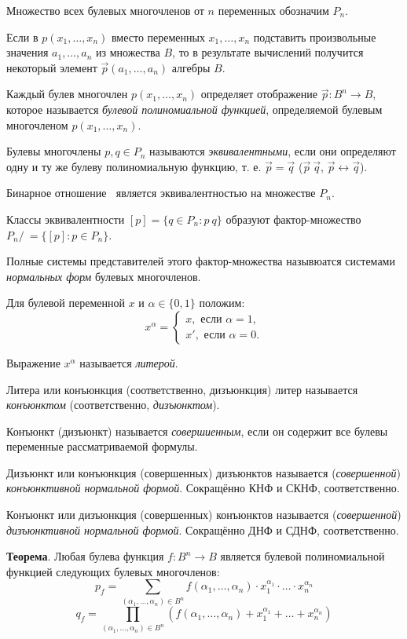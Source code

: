 Множество всех булевых многочленов от $n$ переменных обозначим $P_n$.

Если в $p(x_1, \dots, x_n)$ вместо переменных $x_1, \dots, x_n$ подставить произвольные значения $a_1, \dots, a_n$ из множества $B$, то в результате вычислений получится некоторый элемент $\vec p(a_1, \dots, a_n)$ алгебры $B$.

Каждый булев многочлен $p(x_1, \dots, x_n)$ определяет отображение $\vec p: B^n \to B$, которое называется \textit{булевой полиномиальной функцией}, определяемой булевым многочленом $p(x_1, \dots, x_n)$.

\dftion Булевы многочлены $p, q \in P_n$ называются \textit{эквивалентными}, если они определяют одну и ту же булеву полиномиальную функцию, т. е. $\vec p = \vec q$ ($\vec p ~ \vec q$, $\vec p \leftrightarrow \vec q$).

Бинарное отношение $~$ является эквивалентностью на множестве $P_n$.

Классы эквивалентности $[p]=\{q \in P_n : p ~ q\}$ образуют фактор-множество $P_n /~ = \{[p]: p \in P_n\}$.

Полные системы представителей этого фактор-множества назывюатся системами \textit{нормальных форм} булевых многочленов.

Для булевой переменной $x$ и $\alpha \in \{0,1\}$ положим:
\begin{equation}
    x^\alpha = \begin{cases}
        x, \text{ если } \alpha = 1,\\
        x', \text{ если } \alpha = 0.
    \end{cases}
\end{equation}

Выражение $x^\alpha$ называется \textit{литерой}.

Литера или конъюнкция (соответственно, дизъюнкция) литер называется \textit{конъюнктом} (соответственно, \textit{дизъюнктом}).

Конъюнкт (дизъюнкт) называется \textit{совершиенным}, если он содержит все булевы переменные рассматриваемой формулы.

Дизъюнкт или конъюнкция (совершенных) дизъюнктов называется (\textit{совершенной}) \textit{конъюнктивной нормальной формой}. Сокращённо КНФ и СКНФ, соответственно.

Конъюнкт или дизъюнкция (совершенных) конъюнктов называется (\textit{совершенной}) \textit{дизъюнктивной нормальной формой}. Сокращённо ДНФ и СДНФ, соответственно.

\textbf{Теорема}. Любая булева функция $f:B^n \to B$ является булевой полиномиальной функцией следующих булевых многочленов:
\begin{equation*}
    p_f = \sum_{(\alpha_1,\dots,\alpha_n) \in B^n} f(\alpha_1, \dots, \alpha_n) \cdot x_1^{\alpha_1} \cdot \dots \cdot x_n^{\alpha_n}
\end{equation*}
\begin{equation*}
    q_f = \prod_{(\alpha_1,\dots,\alpha_n) \in B^n} (f(\alpha_1, \dots, \alpha_n) + x_1^{\alpha_1} + \dots + x_n^{\alpha_n})
\end{equation*}

